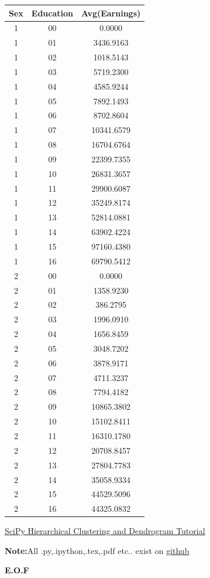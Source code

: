 \documentclass{article}
\begin{document}
\begin{tabular}{|c|c|c|}
\hline
Sex&Education&Avg(Earnings)\\ \hline
1&00&0.0000\\ \hline 
1&01&3436.9163\\ \hline 
1&02&1018.5143\\ \hline 
1&03&5719.2300\\ \hline 
1&04&4585.9244\\ \hline 
1&05&7892.1493\\ \hline 
1&06&8702.8604\\ \hline 
1&07&10341.6579\\ \hline 
1&08&16704.6764\\ \hline 
1&09&22399.7355\\ \hline 
1&10&26831.3657\\ \hline 
1&11&29900.6087\\ \hline 
1&12&35249.8174\\ \hline 
1&13&52814.0881\\ \hline 
1&14&63902.4224\\ \hline 
1&15&97160.4380\\ \hline 
1&16&69790.5412\\ \hline 
2&00&0.0000\\ \hline 
2&01&1358.9230\\ \hline 
2&02&386.2795\\ \hline 
2&03&1996.0910\\ \hline 
2&04&1656.8459\\ \hline 
2&05&3048.7202\\ \hline 
2&06&3878.9171\\ \hline 
2&07&4711.3237\\ \hline 
2&08&7794.4182\\ \hline 
2&09&10865.3802\\ \hline 
2&10&15102.8411\\ \hline 
2&11&16310.1780\\ \hline 
2&12&20708.8457\\ \hline 
2&13&27804.7783\\ \hline 
2&14&35058.9334\\ \hline 
2&15&44529.5096\\ \hline 
2&16&44325.0832\\ \hline 
\end{tabular}
\begin{thebibliography}{9}
\href{https://joernhees.de/blog/2015/08/26/scipy-hierarchical-clustering-and-dendrogram-tutorial/}{SciPy Hierarchical Clustering and Dendrogram Tutorial}
\end{thebibliography}
\textbf{Note:}All .py,.ipython,.tex,.pdf etc.. exist on \href{URL}{github}
\begin{center}
\textbf{E.O.F}
\end{center}
\end{document}
